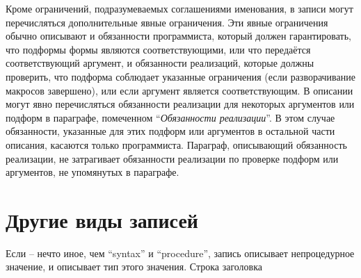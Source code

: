 Кроме ограничений, подразумеваемых соглашениями именования, в записи могут перечисляться
дополнительные явные ограничения. Эти явные ограничения обычно описывают и обязанности
программиста, который должен гарантировать, что подформы формы являются соответствующими, или
что передаётся соответствующий аргумент, и обязанности реализаций, которые должны проверить, что
подформа соблюдает указанные ограничения (если разворачивание макросов завершено), или если
аргумент является соответствующим. В описании могут явно перечисляться обязанности реализации
для некоторых аргументов или подформ в параграфе, помеченном ``\textit {Обязанности
  реализации}''. В этом случае обязанности, указанные для этих подформ или аргументов в
остальной части описания, касаются только программиста. Параграф, описывающий обязанность
реализации, не затрагивает обязанности реализации по проверке подформ или аргументов, не
упомянутых в параграфе.\vspace{2.1mm}

\section{Другие виды записей}\vspace{2.1mm}

Если  -- нечто иное, чем ``syntax'' и ``procedure'', запись описывает
непроцедурное значение, и  описывает тип этого значения. Строка
заголовка\vspace{2.1mm}

